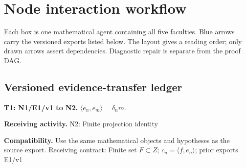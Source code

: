 \documentclass[preprint,12pt,aps,pra,showkeys,amsmath,amssymb,superscriptaddress,floatfix]{revtex4-2}
\theoremstyle{definition}
\theoremstyle{remark}
\newcommand{\field}[2]{\par\smallskip\noindent\textbf{#1.} #2\par}
\begin{document}
\clearpage\section{Node interaction workflow}

\begin{center}\end{center}

Each box is one mathematical agent containing all five faculties. Blue
arrows carry the versioned exports listed below. The layout gives a
reading order; only drawn arrows assert dependencies. Diagnostic repair
is separate from the proof DAG.

\subsection{Versioned evidence-transfer ledger}

\begingroup\small\linespread{1.05}\selectfont

\field{T1: N1/E1/v1 to N2}{\(\langle e_n,e_m\rangle =\delta _nm\).}

\field{Receiving activity}{N2: Finite projection identity}

\field{Compatibility}{Use the same mathematical objects and hypotheses as the source export.
Receiving contract: Finite set \(F\subset Z\);
\(c_n=\langle f,e_n\rangle\); prior exports E1/v1}
\end{document}
